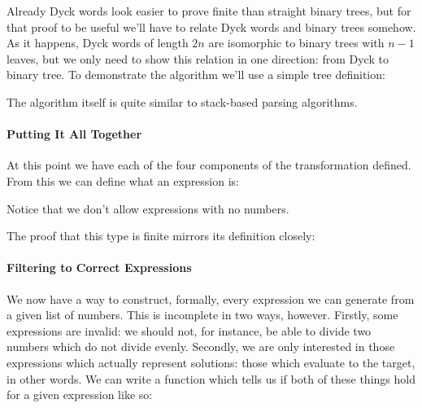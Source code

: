 Already Dyck words look easier to prove finite than straight binary trees, but
for that proof to be useful we'll have to relate Dyck words and binary trees
somehow.
As it happens, Dyck words of length \(2n\) are isomorphic to binary trees with
\(n-1\) leaves, but we only need to show this relation in one direction: from
Dyck to binary tree.
To demonstrate the algorithm we'll use a simple tree definition:
\begin{agdalisting*}
\end{agdalisting*}
The algorithm itself is quite similar to stack-based parsing algorithms.
\begin{agdalisting*}
\end{agdalisting*}
\paragraph{Putting It All Together}
At this point we have each of the four components of the transformation defined.
From this we can define what an expression is:
\begin{agdalisting*}
\end{agdalisting*}
Notice that we don't allow expressions with no numbers.

The proof that this type is finite mirrors its definition closely:
\begin{agdalisting*}
\end{agdalisting*}
\paragraph{Filtering to Correct Expressions}
We now have a way to construct, formally, every expression we can generate from
a given list of numbers.
This is incomplete in two ways, however.
Firstly, some expressions are invalid: we should not, for instance, be able to
divide two numbers which do not divide evenly.
Secondly, we are only interested in those expressions which actually represent
solutions: those which evaluate to the target, in other words.
We can write a function which tells us if both of these things hold for a given
expression like so:

\begin{minipage}{\linewidth}
  \begin{multicols}{2}
    \begin{agdalisting*}
    \end{agdalisting*} \columnbreak
    \begin{agdalisting*}
    \end{agdalisting*}
  \end{multicols} \vspace{\baselineskip}
\end{minipage}

